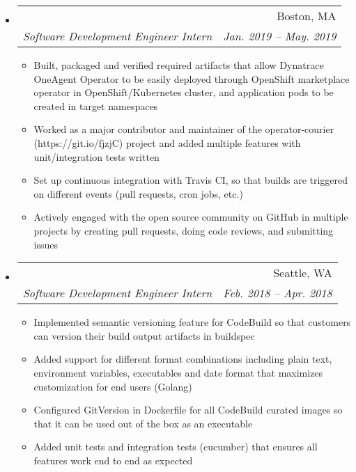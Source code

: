 \documentclass{article}
\makeatletter
\newcommand{\resitem}[1]{
    \item #1
    \vspace{-2pt}
}
\newcommand{\ressubheading}[4]{
\begin{tabular*}{6.80in}{l@{\extracolsep{\fill}}r}
    \textbf{#1} & #2 \\
    \textit{#3} & \textit{#4} \\
\end{tabular*}\vspace{-6pt}}
\makeatother
\begin{document}
\begin{itemize}
        \item
        \ressubheading
        {\href
            {https://operatorhub.io/}
            {Red Hat OpenShift - OperatorHub.io}
        }
        {Boston, MA}
        {Software Development Engineer Intern}
        {Jan. 2019 -- May. 2019}
        {\footnotesize
        \begin{itemize} %
            \resitem
            {Built, packaged and verified required artifacts that allow Dynatrace OneAgent Operator
            to be easily deployed through OpenShift marketplace operator in OpenShift/Kubernetes cluster,
            and application pods to be created in target namespaces}
            \resitem
            {Worked as a major contributor and maintainer of the
                operator-courier (https://git.io/fjzjC)
            project and added multiple features with unit/integration tests written}
            \resitem
            {Set up continuous integration with Travis CI, so that builds are triggered
            on different events (pull requests, cron jobs, etc.)}
            \resitem
            {Actively engaged with the open source community on GitHub in multiple projects
            by creating pull requests, doing code reviews, and submitting issues}
        \end{itemize}
        }

        \item
        \ressubheading
        {\href
            {https://aws.amazon.com/codebuild/}
            {Amazon Web Services - AWS CodeBuild}
        }
        {Seattle, WA}
        {Software Development Engineer Intern}
        {Feb. 2018 -- Apr. 2018}
        {\footnotesize
        \begin{itemize} %
            \resitem
            {Implemented semantic versioning feature for CodeBuild so that
             customers can version their build output artifacts in buildspec}
            \resitem
            {Added support for different format combinations including plain text, environment variables,
            executables and date format that maximizes customization for end users (Golang)}
            \resitem
            {Configured GitVersion in Dockerfile for all CodeBuild curated images so that
            it can be used out of the box as an executable}
            \resitem
            {Added unit tests and integration tests (cucumber) that ensures all features work end to end as expected}
        \end{itemize}
        }

    \end{itemize}
\end{document}
